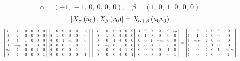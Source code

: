 \documentclass[11pt]{article}
\theoremstyle{definition}
\begin{document}
\[
\alpha = \left( -1, \  -1, \  0, \  0, \  0, \  0\right), \quad \beta = \left( 1, \  0, \  1, \  0, \  0, \  0\right)
\]
\[
\scaletoalign{\textwidth}{\left[ X_{\alpha}\left(u_{0}\right), X_{\beta}\left(v_{0}\right) \right] = X_{\alpha + \beta}\left(u_{0} v_{0}\right)}
\]
\[
\scaletoalign{\textwidth}{{\left[\begin{matrix}1 & 0 & 0 & 0 & 0 & 0\\0 & 1 & 0 & 0 & 0 & 0\\0 & 0 & 1 & 0 & 0 & 0\\0 & - u_{0} & 0 & 1 & 0 & 0\\u_{0} & 0 & 0 & 0 & 1 & 0\\0 & 0 & 0 & 0 & 0 & 1\end{matrix}\right]} {\left[\begin{matrix}1 & 0 & 0 & 0 & 0 & - v_{0}\\0 & 1 & 0 & 0 & 0 & 0\\0 & 0 & 1 & v_{0} & 0 & 0\\0 & 0 & 0 & 1 & 0 & 0\\0 & 0 & 0 & 0 & 1 & 0\\0 & 0 & 0 & 0 & 0 & 1\end{matrix}\right]} {\left[\begin{matrix}1 & 0 & 0 & 0 & 0 & 0\\0 & 1 & 0 & 0 & 0 & 0\\0 & 0 & 1 & 0 & 0 & 0\\0 & u_{0} & 0 & 1 & 0 & 0\\- u_{0} & 0 & 0 & 0 & 1 & 0\\0 & 0 & 0 & 0 & 0 & 1\end{matrix}\right]} {\left[\begin{matrix}1 & 0 & 0 & 0 & 0 & v_{0}\\0 & 1 & 0 & 0 & 0 & 0\\0 & 0 & 1 & - v_{0} & 0 & 0\\0 & 0 & 0 & 1 & 0 & 0\\0 & 0 & 0 & 0 & 1 & 0\\0 & 0 & 0 & 0 & 0 & 1\end{matrix}\right]} = {\left[\begin{matrix}1 & 0 & 0 & 0 & 0 & 0\\0 & 1 & 0 & 0 & 0 & 0\\0 & u_{0} v_{0} & 1 & 0 & 0 & 0\\0 & 0 & 0 & 1 & 0 & 0\\0 & 0 & 0 & 0 & 1 & - u_{0} v_{0}\\0 & 0 & 0 & 0 & 0 & 1\end{matrix}\right]}}
\]
\end{document}
